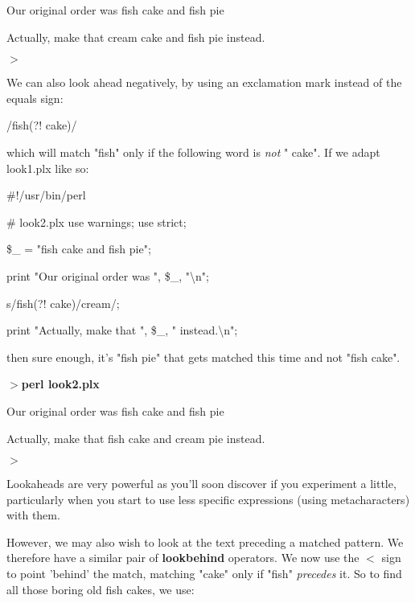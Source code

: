 \documentclass[a4paper,11pt]{book}
\begin{document}
\noindent Our original order was fish cake and fish pie

\noindent Actually, make that cream cake and fish pie instead.

\noindent $>$

\noindent 

\noindent We can also look ahead negatively, by using an exclamation mark instead of the equals sign:

\noindent 

\noindent 

\noindent /fish(?! cake)/

\noindent 

\noindent 

\noindent which will match "fish" only if the following word is \textit{not }" cake". If we adapt look1.plx like so:

\noindent 

\noindent \#!/usr/bin/perl

\noindent \# look2.plx use warnings; use strict;

\noindent 

\noindent \$\_  = "fish cake and fish pie";

\noindent print "Our original order was ", \$\_, "\textbackslash n";

\noindent 

\noindent s/fish(?! cake)/cream/;

\noindent print "Actually, make that ", \$\_, " instead.\textbackslash n";

\noindent 

\noindent then sure enough, it's "fish pie" that gets matched this time and not "fish cake".

\noindent 

\noindent $>$\textbf{perl look2.plx}

\noindent Our original order was fish cake and fish pie

\noindent Actually, make that fish cake and cream pie instead.

\noindent $>$

\noindent 

\noindent Lookaheads are very powerful as you'll soon discover if you experiment a little, particularly when you start to use less specific expressions (using metacharacters) with them.

\noindent 

\noindent However, we may also wish to look at the text preceding a matched pattern. We therefore have a similar pair of \textbf{lookbehind }operators. We now use the $<$ sign to point 'behind' the match, matching "cake" only if "fish" \textit{precedes }it. So to find all those boring old fish cakes, we use:
\end{document}

